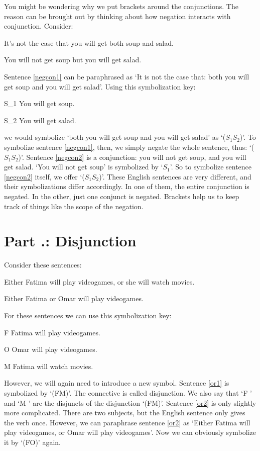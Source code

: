 You might be wondering why we put brackets around the conjunctions. The reason can be brought out by thinking about how negation interacts with conjunction. Consider:
	\begin{earg}
		\item[\ex{negcon1}] It's not the case that you will get both soup and salad.
		\item[\ex{negcon2}] You will not get soup but you will get salad.
	\end{earg}
Sentence \ref{negcon1} can be paraphrased as ‘It is not the case that: both you will get soup and you will get salad’. Using this symbolization key:
	\begin{ekey}
		\item[S_1] You will get soup.
		\item[S_2] You will get salad.
	\end{ekey}
we would symbolize ‘both you will get soup and you will get salad’ as ‘($S_1$\eand $S_2$)’. To symbolize sentence  \ref{negcon1}, then, we simply negate the whole sentence, thus: ‘\enot ($S_1$\eand $S_2$)’.
Sentence \ref{negcon2} is a conjunction: you will not get soup, and you will get salad. ‘You will not get soup’ is symbolized by ‘\enot $S_1$’. So to symbolize sentence  \ref{negcon2} itself, we offer ‘(\enot $S_1$\eand $S_2$)’. These English sentences are very different, and their symbolizations differ accordingly. In one of them, the entire conjunction is negated. In the other, just one conjunct is negated. Brackets help us to keep track of things like the scope of the negation.
\section{Part \thechapcount.\theseccount: Disjunction}
\label{s:Part 5.3 Disjunction}
Consider these sentences:
	\begin{earg}
		\item[\ex{or1}]Either Fatima will play videogames, or she will watch movies.
		\item[\ex{or2}]Either Fatima or Omar will play videogames.
	\end{earg}
For these sentences we can use this symbolization key:
	\begin{ekey}
		\item[F] Fatima will play videogames.
		\item[O] Omar will play videogames.
		\item[M] Fatima will watch movies.
	\end{ekey}
However, we will again need to introduce a new symbol. Sentence \ref{or1} is symbolized by ‘(F\eor M)’. The connective is called \gls{disjunction}. We also say that ‘F ’ and ‘M ’ are the \glspl{disjunct} of the disjunction ‘(F\eor M)’.
Sentence \ref{or2} is only slightly more complicated. There are two subjects, but the English sentence only gives the verb once. However, we can paraphrase sentence \ref{or2} as ‘Either Fatima will play videogames, or Omar will play videogames’. Now we can obviously symbolize it by ‘(F\eor O)’ again.

